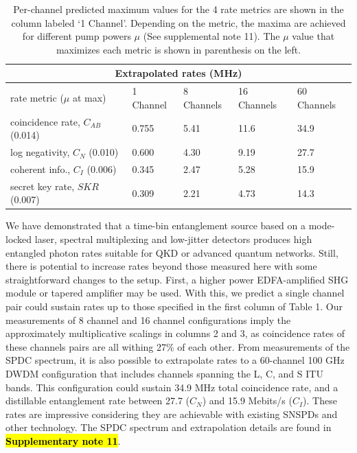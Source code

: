 \documentclass[11pt]{caltech_thesis} %
\begin{document}
\begin{table}
\begin{tabular}{ |p{3.5cm}||p{2.5cm}|p{2.5cm}|p{2.5cm}|p{2.5cm}|}
 \hline
 \multicolumn{5}{|c|}{Extrapolated rates (MHz)} \\
 \hline
 \makecell[l]{rate metric \\ ($\mu$ at max)}   &  1 Channel & 8 Channels & 16 Channels & 60 Channels \label{table:max_rates}\\
 \hline
 \makecell[l]{coincidence rate, $C_{AB}$ \\(0.014)} & 0.755 & 5.41    &  11.6  &  34.9     \\
 \hline
 \makecell[l]{log negativity, $C_N$ \\(0.010)}& 0.600 & 4.30    &  9.19  &  27.7   \\
 \hline
 \makecell[l]{coherent info., $C_I$ \\(0.006)}& 0.345 & 2.47 &  5.28  &  15.9 \\
 \hline
 \makecell[l]{secret key rate, $SKR$ \\(0.007)}& 0.309 & 2.21 &  4.73  &  14.3 \\
 \hline
\end{tabular}
\caption[{Extrapolating entanglement rates to more channels}]{Per-channel predicted maximum values for the 4 rate metrics are shown in the column labeled `1 Channel'. Depending on the metric, the maxima are achieved for different pump powers $\mu$ (See supplemental note 11). The $\mu$ value that maximizes each metric is shown in parenthesis on the left.}
\label{table:maximum_rates}
\end{table}

We have demonstrated that a time-bin entanglement source based on a mode-locked laser, spectral multiplexing and low-jitter detectors produces high entangled photon rates suitable for QKD or advanced quantum networks. Still, there is potential to increase rates beyond those measured here with some straightforward changes to the setup. First, a higher power EDFA-amplified SHG module or tapered amplifier may be used. With this, we predict a single channel pair could sustain rates up to those specified in the first column of Table 1. Our measurements of 8 channel and 16 channel configurations imply the approximately multiplicative scalings in columns 2 and 3, as coincidence rates of these channels pairs are all withing 27\% of each other. From measurements of the SPDC spectrum, it is also possible to extrapolate rates to a 60-channel 100 GHz DWDM configuration that includes channels spanning the L, C, and S ITU bands. This configuration could sustain 34.9 MHz total coincidence rate, and a distillable entanglement rate between 27.7 ($C_N$) and 15.9 Mebits/s ($C_I$). These rates are impressive considering they are achievable with existing SNSPDs and other technology. The SPDC spectrum and extrapolation details are found in \textbf{\hl{Supplementary note 11}}.
\end{document}
